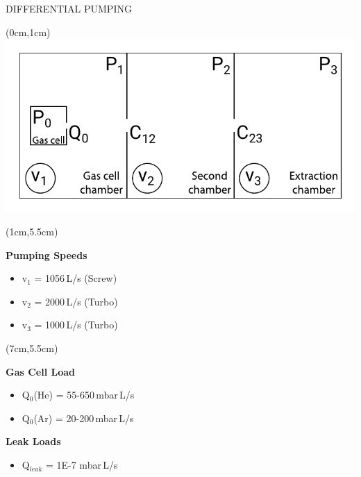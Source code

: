 \documentclass[9pt]{beamer}
\begin{document}
\begin{frame}{DIFFERENTIAL PUMPING}
    \begin{textblock*}{13cm}(0cm,1cm)
            \centering
            \includegraphics[scale=0.7]{assets/simpdiffsect.pdf}
    \end{textblock*}
    
    \begin{textblock*}{5cm}(1cm,5.5cm)
      \centering
      { \textbf{Pumping Speeds}
      \begin{itemize}
          \item v$_1$ = 1056\,L/s (Screw)
          \item v$_2$ = 2000\,L/s (Turbo)
          \item v$_3$ = 1000\,L/s (Turbo)
      \end{itemize}}
    \end{textblock*}
    
    \begin{textblock*}{5cm}(7cm,5.5cm)
      \centering
      { \textbf{Gas Cell Load}
        \begin{itemize}
          \item Q$_0$(He) = 55-650\,mbar\,L/s
          \item Q$_0$(Ar) = 20-200\,mbar\,L/s
        \end{itemize}\textbf{Leak Loads}
        \begin{itemize}
          \item Q$_{leak}$ = 1E-7 mbar\,L/s
        \end{itemize}}
    \end{textblock*}
\end{frame}
\end{document}
